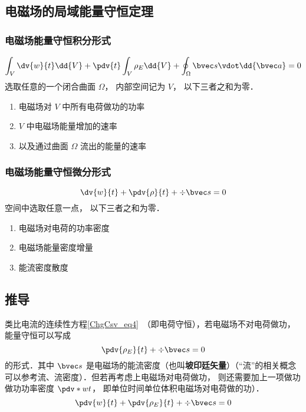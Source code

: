 \subsection{电磁场的局域能量守恒定理}

\subsubsection{电磁场能量守恒积分形式}
\begin{equation}
\int_V \dv{w}{t} \dd{V}  + \pdv{t} \int_V \rho_E \dd{V}  + \oint_\Omega  \bvec s \vdot \dd{\bvec a}  = 0
\end{equation} 
选取任意的一个闭合曲面 $\Omega $， 内部空间记为 $V$， 以下三者之和为零．
\begin{enumerate}
\item 电磁场对 $V$ 中所有电荷做功的功率
\item $V$ 中电磁场能量增加的速率
\item 以及通过曲面 $\Omega $ 流出的能量的速率
\end{enumerate}

\subsubsection{电磁场能量守恒微分形式}
\begin{equation}
\dv{w}{t} + \pdv{\rho}{t} + \div \bvec s = 0
\end{equation} 
空间中选取任意一点， 以下三者之和为零．
\begin{enumerate}
\item 电磁场对电荷的功率密度
\item 电磁场能量密度增量
\item 能流密度散度
\end{enumerate}

\subsection{推导}
类比电流的连续性方程\autoref{ChgCsv_eq4}~（即电荷守恒），若电磁场不对电荷做功，能量守恒可以写成
\begin{equation}
\pdv{\rho_E}{t} + \div \bvec s = 0
\end{equation} 
的形式．其中 $\bvec s$ 是电磁场的能流密度（也叫\textbf{坡印廷矢量}）（“流”的相关概念可以参考流、流密度）．但若再考虑上电磁场对电荷做功， 则还需要加上一项做功做功功率密度 $\pdv*{w}{t}$， 即单位时间单位体积电磁场对电荷做的功）．
\begin{equation}\label{EBS_eq1}
\pdv{w}{t} + \pdv{\rho_E}{t} + \div \bvec s = 0
\end{equation} 

